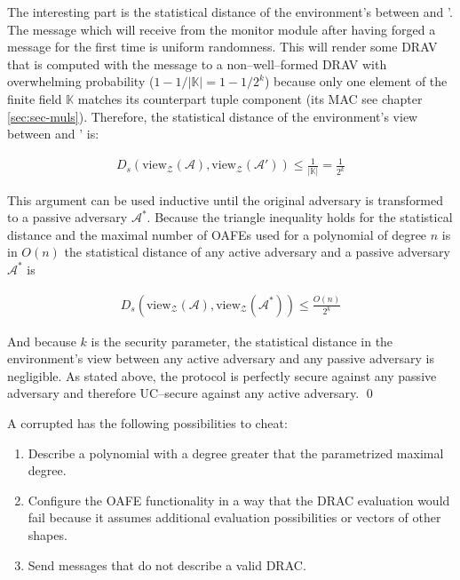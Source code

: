 The interesting part is the statistical distance of the environment's between
\JWadv{} and \JWadv{}'. The message which \JWadv{} will receive from the monitor
module after having forged a message for the first time is uniform randomness.
This will render some DRAV that is computed with the message to a
non--well--formed DRAV with overwhelming probability ($1-1/|\mathbb{K}| =
1-1/2^k$) because only one element of the finite field $\mathbb{K}$ matches its
counterpart tuple component (its MAC see chapter \ref{sec:sec-muls}). Therefore,
the statistical distance of the environment's view between \JWadv{} and
\JWadv{}' is:

\begin{align*}
  D_s(\text{view}_\mathcal{Z}(\mathcal{A}),
  \text{view}_\mathcal{Z}(\mathcal{A}'))
  \leq \frac{1}{|\mathbb{K}|}
  = \frac{1}{2^k}
\end{align*}

\noindent{}This argument can be used inductive until the original adversary
\JWadv{} is transformed to a passive adversary $\mathcal{A}^*$. Because the
triangle inequality holds for the statistical distance and the maximal number of
OAFEs used for a polynomial of degree $n$ is in $O(n)$ the statistical distance
of any active adversary \JWadv{} and a passive adversary $\mathcal{A}^*$ is

\begin{align*}
  D_s(\text{view}_\mathcal{Z}(\mathcal{A}),
  \text{view}_\mathcal{Z}(\mathcal{A}^*))
  \leq \frac{O(n)}{2^k}
\end{align*}

\noindent{}And because $k$ is the security parameter, the statistical distance
in the environment's view between any active adversary and any passive adversary
is negligible. As stated above, the protocol is perfectly secure against any
passive adversary and therefore UC--secure against any active adversary. \qed




A corrupted \JWpOne{} has the following possibilities to cheat:

\begin{enumerate}

  \item Describe a polynomial with a degree greater that the parametrized
    maximal degree.

  \item Configure the OAFE functionality in a way that the DRAC evaluation would
    fail because it assumes additional evaluation possibilities or vectors of
    other shapes.

  \item Send messages that do not describe a valid DRAC\@.

\end{enumerate}

